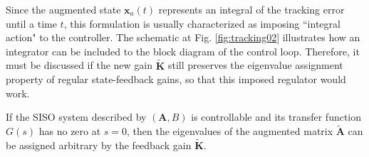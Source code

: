 \documentclass[a4paper,11pt]{book}
\numberwithin{figure}{chapter}
\numberwithin{equation}{chapter}
\numberwithin{table}{chapter}
\newtheorem{theorem}{Theorem}[chapter]
\theoremstyle{definition}
\newcounter{boxed-theorem}
\newenvironment{boxed-theorem}[1]
{\begin{shaded} \begin{theorem}{#1}}
{\end{theorem} \end{shaded}}
\newcounter{boxed-definition}
\begin{document}
Since the augmented state $\bm{x}_a(t)$ represents an integral of the tracking error until a time $t$, this formulation is usually characterized as imposing ``integral action" to the controller. The schematic at Fig. \ref{fig:tracking02} illustrates how an integrator can be included to the block diagram of the control loop. Therefore, it must be discussed if the new gain $\tilde{\bm{K}}$ still preserves the eigenvalue assignment property of regular state-feedback gains, so that this imposed regulator would work.

\begin{boxed-theorem}{} \label{th:augmentedCtrb}
    If the SISO system described by $(\bm{A}, B)$ is controllable and its transfer function $G(s)$ has no zero at $s = 0$, then the eigenvalues of the augmented matrix $\tilde{\bm{A}}$ can be assigned arbitrary by the feedback gain $\tilde{\bm{K}}$.
\end{boxed-theorem}
\end{document}
